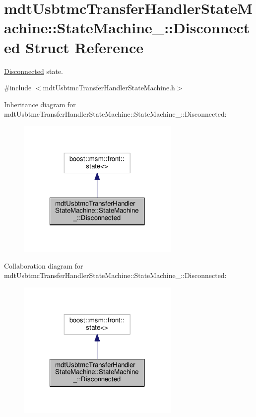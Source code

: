 \hypertarget{structmdt_usbtmc_transfer_handler_state_machine_1_1_state_machine___1_1_disconnected}{\section{mdt\-Usbtmc\-Transfer\-Handler\-State\-Machine\-:\-:State\-Machine\-\_\-\-:\-:Disconnected Struct Reference}
\label{structmdt_usbtmc_transfer_handler_state_machine_1_1_state_machine___1_1_disconnected}
}


\hyperlink{structmdt_usbtmc_transfer_handler_state_machine_1_1_state_machine___1_1_disconnected}{Disconnected} state.  




{\ttfamily \#include $<$mdt\-Usbtmc\-Transfer\-Handler\-State\-Machine.\-h$>$}



Inheritance diagram for mdt\-Usbtmc\-Transfer\-Handler\-State\-Machine\-:\-:State\-Machine\-\_\-\-:\-:Disconnected\-:
\nopagebreak
\begin{figure}[H]
\begin{center}
\leavevmode
\includegraphics[width=222pt]{structmdt_usbtmc_transfer_handler_state_machine_1_1_state_machine___1_1_disconnected__inherit__graph}
\end{center}
\end{figure}


Collaboration diagram for mdt\-Usbtmc\-Transfer\-Handler\-State\-Machine\-:\-:State\-Machine\-\_\-\-:\-:Disconnected\-:
\nopagebreak
\begin{figure}[H]
\begin{center}
\leavevmode
\includegraphics[width=222pt]{structmdt_usbtmc_transfer_handler_state_machine_1_1_state_machine___1_1_disconnected__coll__graph}
\end{center}
\end{figure}

